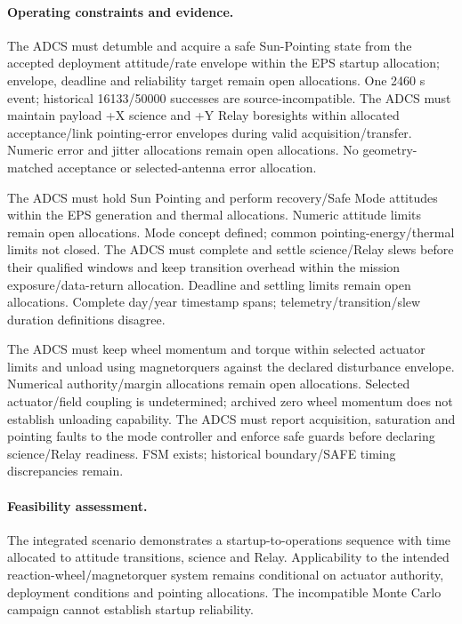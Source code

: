 \paragraph{Operating constraints and evidence.} 
The ADCS must detumble and acquire a safe Sun-Pointing state from the accepted deployment attitude/rate envelope within the EPS startup allocation; envelope, deadline and reliability target remain open allocations. One 2460 s event; historical 16133/50000 successes are source-incompatible.
The ADCS must maintain payload +X science and +Y Relay boresights within allocated acceptance/link pointing-error envelopes during valid acquisition/transfer. Numeric error and jitter allocations remain open allocations. No geometry-matched acceptance or selected-antenna error allocation.

The ADCS must hold Sun Pointing and perform recovery/Safe Mode attitudes within the EPS generation and thermal allocations. Numeric attitude limits remain open allocations. Mode concept defined; common pointing-energy/thermal limits not closed.
The ADCS must complete and settle science/Relay slews before their qualified windows and keep transition overhead within the mission exposure/data-return allocation. Deadline and settling limits remain open allocations. Complete day/year timestamp spans; telemetry/transition/slew duration definitions disagree.

The ADCS must keep wheel momentum and torque within selected actuator limits and unload using magnetorquers against the declared disturbance envelope. Numerical authority/margin allocations remain open allocations. Selected actuator/field coupling is undetermined; archived zero wheel momentum does not establish unloading capability.
The ADCS must report acquisition, saturation and pointing faults to the mode controller and enforce safe guards before declaring science/Relay readiness. FSM exists; historical boundary/SAFE timing discrepancies remain.

\paragraph{Feasibility assessment.} The integrated scenario demonstrates a startup-to-operations sequence with time allocated to attitude transitions, science and Relay. Applicability to the intended reaction-wheel/magnetorquer system remains conditional on actuator authority, deployment conditions and pointing allocations. The incompatible Monte Carlo campaign cannot establish startup reliability.

